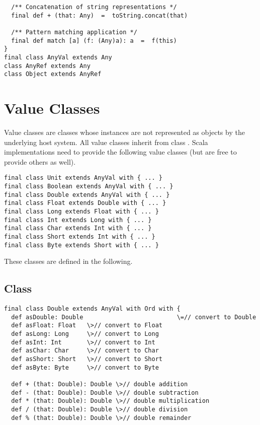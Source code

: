 \documentclass[11pt]{report}
\begin{document}
\begin{itemize}
\begin{verbatim}
  /** Concatenation of string representations */
  final def + (that: Any)  =  toString.concat(that)

  /** Pattern matching application */
  final def match [a] (f: (Any)a): a  =  f(this)
}
final class AnyVal extends Any
class AnyRef extends Any
class Object extends AnyRef
\end{verbatim}


\section{Value Classes}
\label{sec:cls-value}

Value classes are classes whose instances are not represented as
objects by the underlying host system.  All value classes inherit from
class \verb@AnyVal@. Scala implementations need to provide the
following value classes (but are free to provide others as well).

\begin{verbatim}
final class Unit extends AnyVal with { ... }
final class Boolean extends AnyVal with { ... }
final class Double extends AnyVal with { ... }
final class Float extends Double with { ... }
final class Long extends Float with { ... }
final class Int extends Long with { ... }
final class Char extends Int with { ... }
final class Short extends Int with { ... }
final class Byte extends Short with { ... }
\end{verbatim}

These classes are defined in the following.

\subsection{Class }

\begin{verbatim}
final class Double extends AnyVal with Ord with {
  def asDouble: Double                          \=// convert to Double
  def asFloat: Float   \>// convert to Float
  def asLong: Long     \>// convert to Long
  def asInt: Int       \>// convert to Int
  def asChar: Char     \>// convert to Char
  def asShort: Short   \>// convert to Short
  def asByte: Byte     \>// convert to Byte

  def + (that: Double): Double \>// double addition
  def - (that: Double): Double \>// double subtraction
  def * (that: Double): Double \>// double multiplication
  def / (that: Double): Double \>// double division
  def % (that: Double): Double \>// double remainder


\end{verbatim}
\end{itemize}
\end{document}
